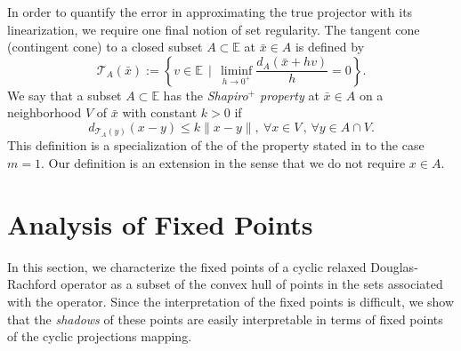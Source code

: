 \documentclass[12pt]{article}
\theoremstyle{definition}
\newcommand{\Ebb}{\mathbb{E}}
\begin{document}
In order to quantify the error in approximating the true projector with its linearization,
we require one final notion of set regularity.  The tangent cone (contingent cone) to a
closed subset $A\subset \Ebb$ at $\bar x\in A$ is defined by \cite[Chapter 4]{Aubin2009}
\begin{equation}
 \mathcal{T}_{A}(\bar x):=\left\{v\in \Ebb\,\mid\,\liminf _{h\to 0^{+}}{\frac {d_{A}(\bar x+hv)}{h}}=0\right\}.
\end{equation}
We say that a subset $A\subset \Ebb$ has the {\em Shapiro$^+$ property} at $\bar x\in A$ on a neighborhood
$V$ of $\bar x$ with constant $k>0$ if
\begin{equation}\label{e:Shapiro+}
    d_{\mathcal{T}_{A}(y)}(x-y)\leq k\|x-y\|,\ \forall x\in V\,,\,\forall y\in A\cap V.
\end{equation}
This definition is a specialization of the of the property stated in \cite{shapiro1994existence} to the case $m=1$.
Our definition is an extension in the sense that we do not require $x\in A$.





\section{Analysis of Fixed Points}
\label{s:characterization}
In this section, we  characterize the fixed points of a cyclic relaxed Douglas-Rachford operator as a subset of the convex hull of  points in the sets associated with the operator.  Since the interpretation of the fixed points is difficult, we show that the {\em shadows} of these points are easily interpretable in terms of fixed points of the cyclic projections mapping. 
\end{document}
